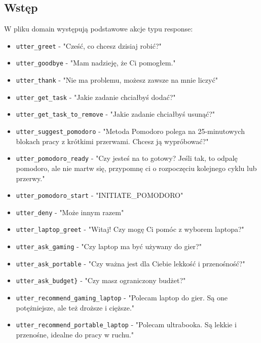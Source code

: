 \documentclass{article}
\begin{document}
\subsection{Wstęp}
W pliku domain występują podstawowe akcje typu response:
\begin{itemize}
    \item[\textcolor{violet}{\textbullet}] \verb|utter_greet| - "Cześć, co chcesz dzisiaj robić?"
  \item[\textcolor{violet}{\textbullet}] \verb|utter_goodbye| - "Mam nadzieję, że Ci pomogłem."
  \item[\textcolor{violet}{\textbullet}] \verb|utter_thank| - "Nie ma problemu, możesz zawsze na mnie liczyć"
  \item[\textcolor{violet}{\textbullet}] \verb|utter_get_task| - "Jakie zadanie chciałbyś dodać?"
  \item[\textcolor{violet}{\textbullet}] \verb|utter_get_task_to_remove| - "Jakie zadanie chciałbyś usunąć?"
  \item[\textcolor{violet}{\textbullet}] \verb|utter_suggest_pomodoro| - "Metoda Pomodoro polega na 25-minutowych blokach pracy z krótkimi przerwami. Chcesz ją wypróbować?"
  \item[\textcolor{violet}{\textbullet}] \verb|utter_pomodoro_ready| - "Czy jesteś na to gotowy? Jeśli tak, to odpalę pomodoro, ale nie martw się, przypomnę ci o rozpoczęciu kolejnego cyklu lub przerwy."
  \item[\textcolor{violet}{\textbullet}] \verb|utter_pomodoro_start| - "INITIATE\_POMODORO"
  \item[\textcolor{violet}{\textbullet}] \verb|utter_deny| - "Może innym razem"
  \item[\textcolor{violet}{\textbullet}] \verb|utter_laptop_greet| - "Witaj! Czy mogę Ci pomóc z wyborem laptopa?"
  \item[\textcolor{violet}{\textbullet}] \verb|utter_ask_gaming| - "Czy laptop ma być używany do gier?"
  \item[\textcolor{violet}{\textbullet}] \verb|utter_ask_portable| - "Czy ważna jest dla Ciebie lekkość i przenośność?"
  \item[\textcolor{violet}{\textbullet}] \verb|utter_ask_budget}| - "Czy masz ograniczony budżet?"
  \item[\textcolor{violet}{\textbullet}] \verb|utter_recommend_gaming_laptop| - "Polecam laptop do gier. Są one potężniejsze, ale też droższe i cięższe."
  \item[\textcolor{violet}{\textbullet}] \verb|utter_recommend_portable_laptop| - "Polecam ultrabooka. Są lekkie i przenośne, idealne do pracy w ruchu."

\end{itemize}
\end{document}
